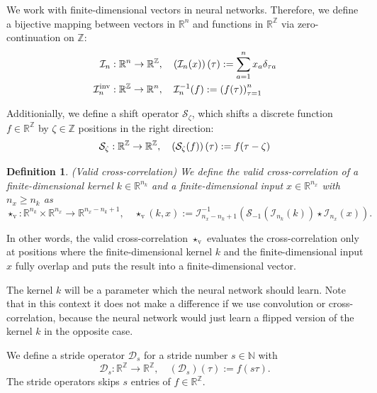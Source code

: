 \documentclass[twoside,a4paper]{article}
\newtheorem{definition}{Definition}
\begin{document}
We work with finite-dimensional vectors in neural networks. Therefore, we define a bijective mapping between
vectors in $\mathbb{R}^n$ and functions in $\mathbb{R}^{\mathbb{Z}}$ 
via zero-continuation on $\mathbb{Z}$:
\begin{align*}
	\mathcal{I}_n &: \mathbb{R}^n \to \mathbb{R}^{\mathbb{Z}},
	\quad \left(\mathcal{I}_n(x)\right)(\tau) := \sum_{a=1}^{n} x_a \delta_{\tau a} \\
	\mathcal{I}_n^{\text{inv}} &: \mathbb{R}^{\mathbb{Z}} \to \mathbb{R}^n,
	\quad \mathcal{I}_n^{-1}(f) := \left( f(\tau) \right)_{\tau=1}^n
\end{align*}

Additionially, we define a shift operator $\mathcal{S}_\zeta$, 
which shifts a discrete function $f \in \mathbb{R}^\mathbb{Z}$ by $\zeta \in \mathbb{Z}$ positions
in the right direction:
\begin{equation*}
	\mathcal{S}_\zeta : \mathbb{R}^{\mathbb{Z}} \to \mathbb{R}^{\mathbb{Z}},
	\quad \left( \mathcal{S}_\zeta(f) \right) (\tau) := f(\tau - \zeta)
\end{equation*}

\begin{definition}\label{def_cross_corr}
	(Valid cross-correlation)
	We define the valid cross-correlation of a finite-dimensional kernel $k \in \mathbb{R}^{n_k}$ and 
	a finite-dimensional input $x \in \mathbb{R}^{n_x}$ with $n_x \geq n_k$ as
	\begin{equation*}
		\star_{\text{v}} : \mathbb{R}^{n_k} \times \mathbb{R}^{n_x} \to \mathbb{R}^{n_x-n_k+1},
		\quad \star_{\text{v}}(k,x) := \mathcal{I}_{n_x-n_k+1}^{-1} (
			\mathcal{S}_{-1}( \mathcal{I}_{n_k}(k)) \star \mathcal{I}_{n_x}(x)
		)
		.
	\end{equation*}
\end{definition}
In other words, the valid cross-correlation $\star_{\text{v}}$ evaluates the cross-correlation 
only at positions where the finite-dimensional kernel $k$ and the 
finite-dimensional input $x$ fully overlap and puts the result into a finite-dimensional vector.

The kernel $k$ will be a parameter which the neural network should learn.
Note that in this context it does not make a difference if we use convolution or cross-correlation, because
the neural network would just learn a flipped version of the kernel $k$ in the opposite case.

We define a stride operator $\mathcal{D}_s$ for a stride number $s \in \mathbb{N}$ with
\begin{equation*}
	\mathcal{D}_s : \mathbb{R}^{\mathbb{Z}} \to \mathbb{R}^{\mathbb{Z}},
	\quad (\mathcal{D}_s)(\tau) := f(s \tau)
	.
\end{equation*}
The stride operators skips $s$ entries of $f \in \mathbb{R}^\mathbb{Z}$.
\end{document}
